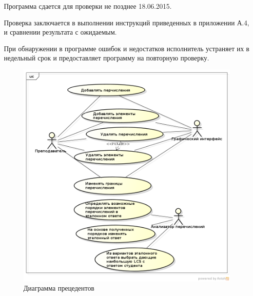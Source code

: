 \documentclass[a4paper,english]{G2-105}
\begin{document}
\par Программа сдается для проверки не позднее 18.06.2015.
\par Проверка заключается в выполнении инструкций приведенных в приложении А.4, и сравнении результата с ожидаемым.
\par При обнаружении в программе ошибок и недостатков исполнитель устраняет их в недельный срок и предоставляет программу на повторную проверку.

\begin{figure} 
\includegraphics[width = \linewidth]{usecase.png}
\caption{Диаграмма прецедентов}\label{use-case}
\end{figure}
\end{document}
